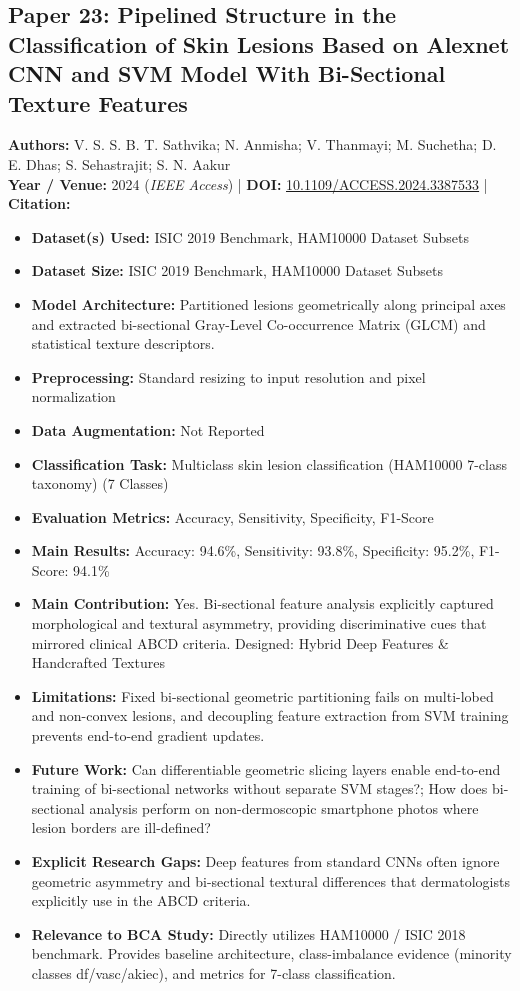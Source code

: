 \documentclass[11pt,a4paper]{article}
\begin{document}
\subsection{Paper 23: Pipelined Structure in the Classification of Skin Lesions Based on Alexnet CNN and SVM Model With Bi-Sectional Texture Features}
\textbf{Authors:} V. S. S. B. T. Sathvika; N. Anmisha; V. Thanmayi; M. Suchetha; D. E. Dhas; S. Sehastrajit; S. N. Aakur \\
\textbf{Year / Venue:} 2024 (\textit{IEEE Access}) | \textbf{DOI:} \href{https://doi.org/10.1109/ACCESS.2024.3387533}{10.1109/ACCESS.2024.3387533} | \textbf{Citation:} \cite{10496674}

\begin{itemize}\small
\item \textbf{Dataset(s) Used:} ISIC 2019 Benchmark, HAM10000 Dataset Subsets
\item \textbf{Dataset Size:} ISIC 2019 Benchmark, HAM10000 Dataset Subsets
\item \textbf{Model Architecture:} Partitioned lesions geometrically along principal axes and extracted bi-sectional Gray-Level Co-occurrence Matrix (GLCM) and statistical texture descriptors.
\item \textbf{Preprocessing:} Standard resizing to input resolution and pixel normalization
\item \textbf{Data Augmentation:} Not Reported
\item \textbf{Classification Task:} Multiclass skin lesion classification (HAM10000 7-class taxonomy) (7 Classes)
\item \textbf{Evaluation Metrics:} Accuracy, Sensitivity, Specificity, F1-Score
\item \textbf{Main Results:} Accuracy: 94.6\%, Sensitivity: 93.8\%, Specificity: 95.2\%, F1-Score: 94.1\%
\item \textbf{Main Contribution:} Yes. Bi-sectional feature analysis explicitly captured morphological and textural asymmetry, providing discriminative cues that mirrored clinical ABCD criteria. Designed: Hybrid Deep Features \& Handcrafted Textures
\item \textbf{Limitations:} Fixed bi-sectional geometric partitioning fails on multi-lobed and non-convex lesions, and decoupling feature extraction from SVM training prevents end-to-end gradient updates.
\item \textbf{Future Work:} Can differentiable geometric slicing layers enable end-to-end training of bi-sectional networks without separate SVM stages?; How does bi-sectional analysis perform on non-dermoscopic smartphone photos where lesion borders are ill-defined?
\item \textbf{Explicit Research Gaps:} Deep features from standard CNNs often ignore geometric asymmetry and bi-sectional textural differences that dermatologists explicitly use in the ABCD criteria.
\item \textbf{Relevance to BCA Study:} Directly utilizes HAM10000 / ISIC 2018 benchmark. Provides baseline architecture, class-imbalance evidence (minority classes df/vasc/akiec), and metrics for 7-class classification.
\end{itemize}
\end{document}
